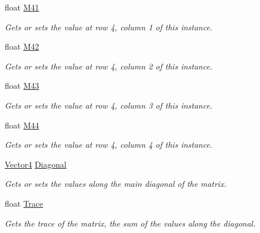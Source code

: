 \begin{DoxyCompactItemize}
float \hyperlink{struct_open_t_k_1_1_matrix4_aa19e3083cee4c445d63a4b72f8b71011}{M41}
\begin{DoxyCompactList}\small\item\em Gets or sets the value at row 4, column 1 of this instance. \end{DoxyCompactList}\item 
float \hyperlink{struct_open_t_k_1_1_matrix4_a2cf2cf88603879c9c92d43241b313959}{M42}
\begin{DoxyCompactList}\small\item\em Gets or sets the value at row 4, column 2 of this instance. \end{DoxyCompactList}\item 
float \hyperlink{struct_open_t_k_1_1_matrix4_a3ffbf71f8cc86369e904314993f1ce12}{M43}
\begin{DoxyCompactList}\small\item\em Gets or sets the value at row 4, column 3 of this instance. \end{DoxyCompactList}\item 
float \hyperlink{struct_open_t_k_1_1_matrix4_aa6fe6e3bada9edc1cae56372a92bf7ea}{M44}
\begin{DoxyCompactList}\small\item\em Gets or sets the value at row 4, column 4 of this instance. \end{DoxyCompactList}\item 
\hyperlink{struct_open_t_k_1_1_vector4}{Vector4} \hyperlink{struct_open_t_k_1_1_matrix4_ae8e762c4a2c8536e12e67380abf3083a}{Diagonal}
\begin{DoxyCompactList}\small\item\em Gets or sets the values along the main diagonal of the matrix. \end{DoxyCompactList}\item 
float \hyperlink{struct_open_t_k_1_1_matrix4_a0e8edded0f0459923d3943e43a5e72b2}{Trace}
\begin{DoxyCompactList}\small\item\em Gets the trace of the matrix, the sum of the values along the diagonal. \end{DoxyCompactList}\item 

\end{DoxyCompactItemize}
